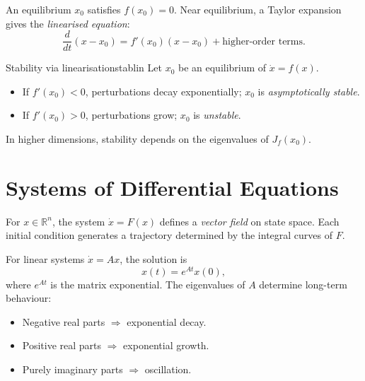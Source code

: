 \documentclass[12pt,openany]{book}
\newcommand{\R}{\mathbb{R}}
\begin{document}
An equilibrium $x_0$ satisfies $f(x_0)=0$. Near equilibrium, a Taylor
expansion gives the \emph{linearised equation}:
\[
  \frac{d}{dt}(x-x_0) = f'(x_0)(x-x_0) + \text{higher-order terms}.
\]

\begin{theorem}{Stability via linearisation}{stablin}
  Let $x_0$ be an equilibrium of $\dot x = f(x)$.
  \begin{itemize}[leftmargin=1.5em]
    \item If $f'(x_0)<0$, perturbations decay exponentially; $x_0$ is
      \emph{asymptotically stable}.
    \item If $f'(x_0)>0$, perturbations grow; $x_0$ is \emph{unstable}.
  \end{itemize}
\end{theorem}

In higher dimensions, stability depends on the eigenvalues of $J_f(x_0)$.

\section{Systems of Differential Equations}

For $x\in\R^n$, the system $\dot x = F(x)$ defines a \emph{vector field} on
state space. Each initial condition generates a trajectory determined by the
integral curves of $F$.

For linear systems $\dot x = Ax$, the solution is
\[
  x(t) = e^{At}x(0),
\]
where $e^{At}$ is the matrix exponential. The eigenvalues of $A$ determine
long-term behaviour:
\begin{itemize}[leftmargin=1.5em]
  \item Negative real parts $\Rightarrow$ exponential decay.
  \item Positive real parts $\Rightarrow$ exponential growth.
  \item Purely imaginary parts $\Rightarrow$ oscillation.
\end{itemize}
\end{document}
